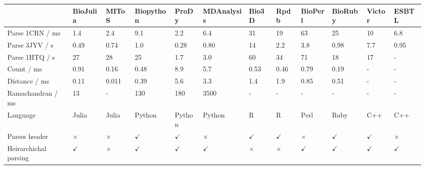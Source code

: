 \begin{table}
\centering

\begin{footnotesize}
\begin{tabular}{ l p{1.2cm} p{1.2cm} p{1.5cm} p{1.2cm} p{1.7cm} p{1.2cm} p{1.2cm} p{1.2cm} p{1.2cm} p{1.2cm} p{1.2cm} }
\hline
                      & BioJulia     & MIToS        & Biopython    & ProDy        & MDAnalysis   & Bio3D        & Rpdb         & BioPerl               & BioRuby      & Victor        & ESBTL        \\
\hline
Parse 1CRN / ms       & 1.4          & 2.4          & 9.1          & 2.2          & 6.4          & 31           & 19           & 63                    & 25           & 10            & 6.8          \\
Parse 3JYV / s        & 0.49         & 0.74         & 1.0          & 0.28         & 0.80         & 14           & 2.2          & 3.8                   & 0.98         & 7.7           & 0.95         \\
Parse 1HTQ / s        & 27           & 28           & 25           & 1.7          & 3.0          & 60           & 34           & 71                    & 18           & 17            & -            \\
Count / ms            & 0.91         & 0.16         & 0.48         & 8.9          & 5.7          & 0.53         & 0.46         & 0.79                  & 0.19         & -             & -            \\
Distance / ms         & 0.11         & 0.011        & 0.39         & 5.6          & 3.3          & 1.4          & 1.9          & 0.85                  & 0.51         & -             & -            \\
Ramachandran / ms     & 13           & -            & 130          & 180          & 3500         & -            & -            & -                     & -            & -             & -            \\
Language              & Julia        & Julia        & Python       & Python       & Python       & R            & R            & Perl                  & Ruby         & C++           & C++          \\
Parses header         & $\times$     & $\times$     & $\checkmark$ & $\checkmark$ & $\times$     & $\checkmark$ & $\checkmark$ & $\times$              & $\checkmark$ & $\checkmark$  & $\times$     \\
Heirarchichal parsing & $\checkmark$ & $\times$     & $\checkmark$ & $\checkmark$ & $\checkmark$ & $\times$     & $\times$     & $\checkmark$          & $\checkmark$ & $\checkmark$  & $\checkmark$ \\

\end{tabular}
\end{footnotesize}
\end{table}

